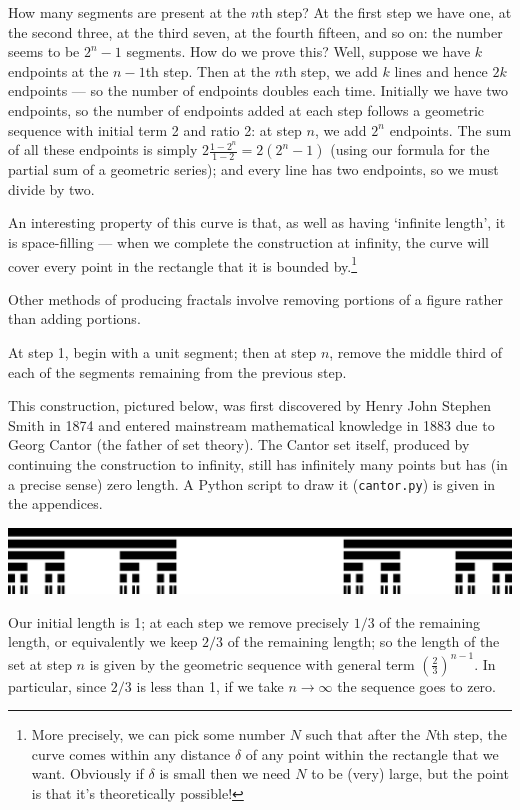 How many segments are present at the $ n$th step? At the first step we have one, at the second three, at the third seven, at the fourth fifteen,
and so on: the number seems to be $ 2^n - 1 $ segments. How do we prove this? Well, suppose we have $ k $ endpoints at the $ n - 1 $th step. Then
at the $ n$th step, we add $ k $ lines and hence $ 2k $ endpoints --- so the number of endpoints doubles each time. Initially we have two endpoints, so the number
of endpoints added at each step follows a geometric sequence with initial term 2 and ratio 2: at step $ n $, we add $ 2^n $ endpoints. The sum
of all these endpoints is simply $ 2 \frac{1 - 2^n}{1 - 2} = 2(2^n - 1) $ (using our formula for the partial sum of a geometric series); and
every line has two endpoints, so we must divide by two.

An interesting property of this curve is that, as well as having `infinite length', it is space-filling --- when we complete the construction
at infinity, the curve will cover every point in the rectangle that it is bounded by.\footnote{More precisely, we can pick some number $ N $ such that
after the $ N$th step, the curve comes within any distance $ \delta $ of any point within the rectangle that we want. Obviously if $ \delta $ is small
then we need $ N $ to be (very) large, but the point is that it's theoretically possible!}

Other methods of producing fractals involve removing portions of a figure rather than adding portions.

\begin{con}
  At step 1, begin with a unit segment; then at step $ n $, remove the middle third of each of the segments remaining from
  the previous step.
\end{con}
This construction, pictured below, was first discovered by Henry John Stephen Smith in 1874 and entered mainstream mathematical knowledge
in 1883 due to Georg Cantor (the father of set theory). The Cantor set itself, produced by continuing the construction to infinity, still
has infinitely many points but has (in a precise sense) zero length. A Python script to draw it (\texttt{cantor.py}) is given in the appendices.
\begin{center}
  \includegraphics[width=\textwidth]{cantor}
\end{center}
Our initial length is 1; at each step we remove precisely $ 1/3 $ of the remaining length, or equivalently we keep $ 2/3 $ of the remaining
length; so the length of the set at step $ n $ is given by the geometric sequence with general term $ \left(\frac{2}{3}\right)^{n - 1} $. In
particular, since $ 2/3 $ is less than 1, if we take $ n \to \infty $ the sequence goes to zero.

